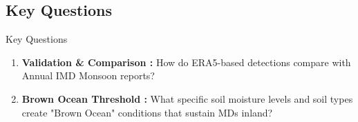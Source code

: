 \documentclass[8pt, aspectratio=169]{beamer}
\begin{document}
\subsection{Key Questions}
\begin{frame}{}
    \begin{block}{Key Questions}
        \tiny
        \begin{enumerate}
            \item \textbf{Validation \& Comparison :} How do ERA5-based detections compare with Annual IMD Monsoon reports?
                \item \textbf{Brown Ocean Threshold :} What specific soil moisture levels and soil types create "Brown Ocean" conditions that sustain MDs inland?

\end{enumerate}
\end{block}
\end{frame}
\end{document}
